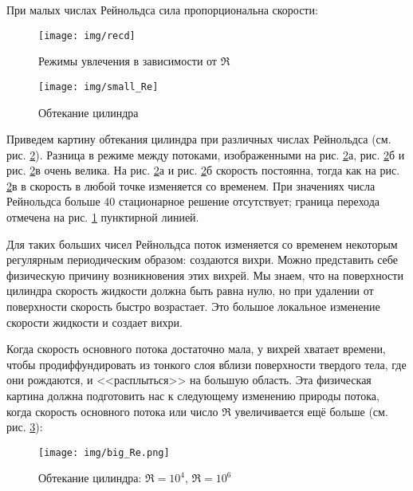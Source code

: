 При малых числах Рейнольдса сила пропорциональна скорости:
\begin{figure}[H]
    \centering
    \texttt{[image: img/recd]}
    \caption{Режимы увлечения в зависимости от  $\Re$}
    \label{fig:cdre}
\end{figure}



\begin{figure}[H]
	\centering
	\texttt{[image: img/small\_Re]}
	\caption{Обтекание цилиндра}
	\label{fig:small_Re}
\end{figure}
Приведем картину обтекания цилиндра при различных числах Рейнольдса (см. рис. \ref{fig:small_Re}). Разница в режиме между потоками, изображенными на  рис. \ref{fig:small_Re}а, рис. \ref{fig:small_Re}б и рис. \ref{fig:small_Re}в очень велика. На рис. \ref{fig:small_Re}а и рис. \ref{fig:small_Re}б скорость постоянна, тогда как на  рис. \ref{fig:small_Re}в в скорость в любой точке изменяется со временем. При значениях числа Рейнольдса больше $40$ стационарное решение отсутствует; граница перехода отмечена на рис. \ref{fig:cdre} пунктирной линией.

Для таких больших чисел Рейнольдса поток изменяется со временем некоторым регулярным периодическим образом: создаются вихри. Можно представить себе физическую причину возникновения этих вихрей. Мы знаем, что на поверхности цилиндра скорость жидкости должна быть равна нулю, но при удалении от поверхности скорость быстро возрастает. Это большое локальное изменение скорости жидкости и создает вихри.

Когда скорость основного потока достаточно мала, у вихрей хватает времени, чтобы продиффундировать из тонкого слоя вблизи поверхности твердого тела, где они рождаются, и <<расплыться>> на большую область. Эта физическая картина должна подготовить нас к следующему изменению природы потока, когда скорость основного потока или число $\Re$ увеличивается ещё больше (см. рис. \ref{fig:small_Re2}):
\begin{figure}[H]
	\centering
	\texttt{[image: img/big\_Re.png]}
	\caption{Обтекание цилиндра: $\Re=10^4$, $\Re=10^6$}
	\label{fig:small_Re2}
\end{figure}

